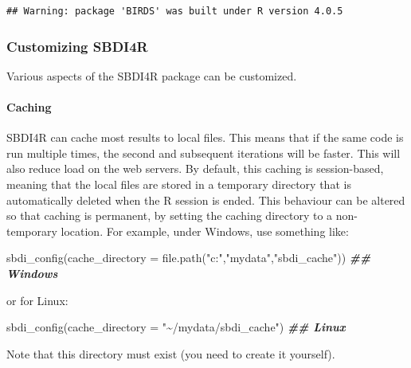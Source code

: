 \documentclass[
  10pt,
]{article}
\newenvironment{Shaded}{\begin{snugshade}}{\end{snugshade}}
\newcommand{\AttributeTok}[1]{\textcolor[rgb]{0.77,0.63,0.00}{#1}}
\newcommand{\DocumentationTok}[1]{\textcolor[rgb]{0.56,0.35,0.01}{\textbf{\textit{#1}}}}
\newcommand{\FunctionTok}[1]{\textcolor[rgb]{0.00,0.00,0.00}{#1}}
\newcommand{\NormalTok}[1]{#1}
\newcommand{\StringTok}[1]{\textcolor[rgb]{0.31,0.60,0.02}{#1}}
\begin{document}
\begin{verbatim}
## Warning: package 'BIRDS' was built under R version 4.0.5
\end{verbatim}

\hypertarget{customizing-sbdi4r}{%
\subsubsection*{Customizing SBDI4R}\label{customizing-sbdi4r}}

Various aspects of the SBDI4R package can be customized.

\hypertarget{caching}{%
\paragraph*{Caching}\label{caching}}

SBDI4R can cache most results to local files. This means that if the same code is run multiple times, the second and subsequent iterations will be faster. This will also reduce load on the web servers. By default, this caching is session-based, meaning that the local files are stored in a temporary directory that is automatically deleted when the R session is ended. This behaviour can be altered so that caching is permanent, by setting the caching directory to a non-temporary location. For example, under Windows, use something like:

\begin{Shaded}
\begin{Highlighting}[]
\FunctionTok{sbdi\_config}\NormalTok{(}\AttributeTok{cache\_directory =} \FunctionTok{file.path}\NormalTok{(}\StringTok{"c:"}\NormalTok{,}\StringTok{"mydata"}\NormalTok{,}\StringTok{"sbdi\_cache"}\NormalTok{)) }\DocumentationTok{\#\# Windows}
\end{Highlighting}
\end{Shaded}

or for Linux:

\begin{Shaded}
\begin{Highlighting}[]
\FunctionTok{sbdi\_config}\NormalTok{(}\AttributeTok{cache\_directory =} \StringTok{"\textasciitilde{}/mydata/sbdi\_cache"}\NormalTok{) }\DocumentationTok{\#\# Linux}
\end{Highlighting}
\end{Shaded}

Note that this directory must exist (you need to create it yourself).
\end{document}

